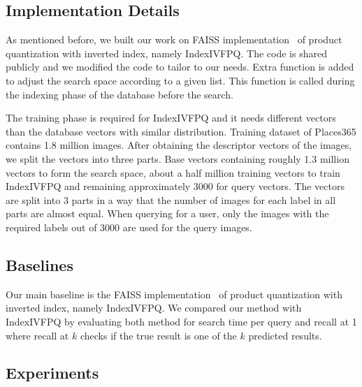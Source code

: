 \subsection{Implementation Details}

As mentioned before, we built our work on FAISS implementation~\cite{faiss} of product quantization with inverted index, namely IndexIVFPQ. 
The code is shared publicly and we modified the code to tailor to our needs.
Extra function is added to adjust the search space according to a given list. 
This function is called during the indexing phase of the database before the search.

The training phase is required for IndexIVFPQ and it needs different vectors than the database vectors with similar distribution.
Training dataset of Places365 contains 1.8 million images. 
After obtaining the descriptor vectors of the images, we split the vectors into three parts.
Base vectors containing roughly 1.3 million vectors to form the search space, about a half million training vectors to train IndexIVFPQ and remaining approximately 3000 for query vectors.
The vectors are split into 3 parts in a way that the number of images for each label in all parts are almost equal.
When querying for a user, only the images with the required labels out of 3000 are used for the query images.

\subsection{Baselines}

Our main baseline is the FAISS implementation~\cite{faiss} of product quantization with inverted index, namely IndexIVFPQ.
We compared our method with IndexIVFPQ by evaluating both method for search time per query and recall at 1 where recall at $k$ checks if the true result is one of the $k$ predicted results. 

\subsection{Experiments}

